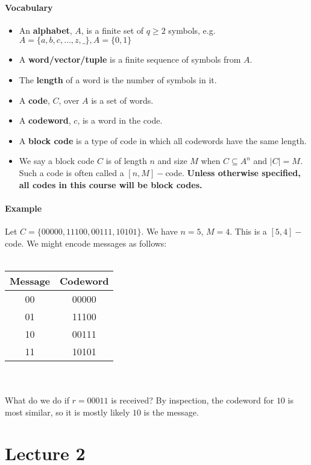 \documentclass[10pt,letter]{article}
\theoremstyle{plain}
\theoremstyle{definition}
\begin{document}
\paragraph{Vocabulary}
\begin{itemize}
    \item An \textbf{alphabet}, $A$, is a finite set of $q\geq2$ symbols, e.g. $A=\{a,b,c,\ldots,z,\_\}, A=\{0,1\}$ 
    \item A \textbf{word/vector/tuple} is a finite sequence of symbols from $A$. 
    \item The \textbf{length} of a word is the number of symbols in it. 
    \item A \textbf{code}, $C$, over $A$ is a set of words. 
    \item A \textbf{codeword}, $c$, is a word in the code. 
    \item A \textbf{block code} is a type of code in which all codewords have the same length. 
    \item We say a block code $C$ is of length $n$ and size $M$ when $C\subseteq A^n$ and $|C|=M$. Such a code is often called a $[n,M]-$code. \textbf{Unless otherwise specified, all codes in this course will be block codes.}
\end{itemize}

\paragraph{Example}
Let $C=\{00000,11100,00111,10101\}$. We have $n=5$, $M=4$. This is a $[5,4]-$code. We might encode messages as follows: \\ \\
\begin{tabular}{|c|c|}
\hline
Message & Codeword \\ \hline
00      & 00000    \\
01      & 11100    \\      
10      & 00111    \\ 
11      & 10101    \\
\hline
\end{tabular}\\ \\
What do we do if $r=00011$ is received? By inspection, the codeword for $10$ is most similar, so it is mostly likely $10$ is the message. 

\section*{Lecture 2}
\end{document}
